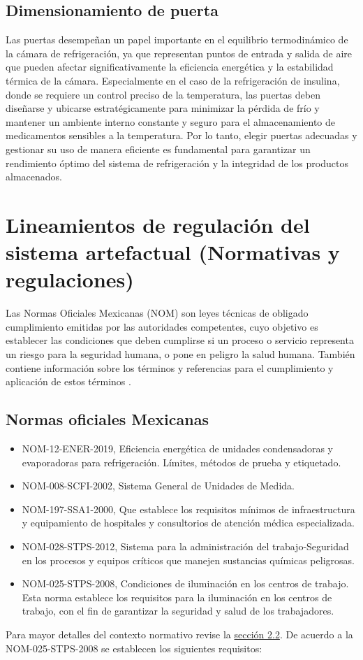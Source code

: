 \subsection{Dimensionamiento de puerta}

Las puertas desempeñan un papel importante en el equilibrio termodinámico de la cámara de refrigeración, ya que representan puntos de entrada y salida de aire que pueden afectar significativamente la eficiencia energética y la estabilidad térmica de la cámara. Especialmente en el caso de la refrigeración de insulina, donde se requiere un control preciso de la temperatura, las puertas deben diseñarse y ubicarse estratégicamente para minimizar la pérdida de frío y mantener un ambiente interno constante y seguro para el almacenamiento de medicamentos sensibles a la temperatura. Por lo tanto, elegir puertas adecuadas y gestionar su uso de manera eficiente es fundamental para garantizar un rendimiento óptimo del sistema de refrigeración y la integridad de los productos almacenados. 
 
 
 

\section{Lineamientos de regulación del sistema artefactual (Normativas y regulaciones)}

Las Normas Oficiales Mexicanas (NOM) son leyes técnicas de obligado cumplimiento emitidas por las autoridades competentes, cuyo objetivo es establecer las condiciones que deben cumplirse si un proceso o servicio representa un riesgo para la seguridad humana, o pone en peligro la salud humana. También contiene información sobre los términos y referencias para el cumplimiento y aplicación de estos términos \cite{salud-2022}.
\subsection{Normas oficiales Mexicanas}
\begin{itemize}
	\item NOM-12-ENER-2019, Eficiencia energética de unidades condensadoras y evaporadoras para refrigeración. Límites, métodos de prueba y etiquetado.
	\item NOM-008-SCFI-2002, Sistema General de Unidades de Medida.
	\item NOM-197-SSA1-2000, Que establece los requisitos mínimos de infraestructura y equipamiento de hospitales y consultorios de atención médica especializada.
	\item NOM-028-STPS-2012, Sistema para la administración del trabajo-Seguridad en los procesos y equipos críticos que manejen sustancias químicas peligrosas.
	\item NOM-025-STPS-2008, Condiciones de iluminación en los
	centros de trabajo. Esta norma establece los requisitos para la iluminación en los
	centros de trabajo, con el fin de garantizar la seguridad y salud de los trabajadores.
\end{itemize}
Para mayor detalles del contexto normativo revise la \hyperref[sec:contexto-normativo]{sección 2.2}.
De acuerdo a la NOM-025-STPS-2008 se establecen los siguientes requisitos:


